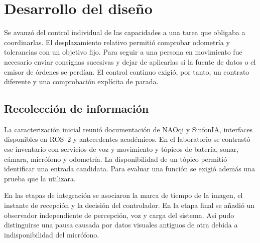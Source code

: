 \documentclass[11pt,letterpaper]{article}
\begin{document}
\clearpage
\section{Desarrollo del diseño}
Se avanzó del control individual de las capacidades a una tarea que obligaba a coordinarlas. El desplazamiento relativo permitió comprobar odometría y tolerancias con un objetivo fijo. Para seguir a una persona en movimiento fue necesario enviar consignas sucesivas y dejar de aplicarlas si la fuente de datos o el emisor de órdenes se perdían. El control continuo exigió, por tanto, un contrato diferente y una comprobación explícita de parada.

\subsection{Recolección de información}
La caracterización inicial reunió documentación de NAOqi y SinfonIA, interfaces disponibles en ROS~2 y antecedentes académicos. En el laboratorio se contrastó ese inventario con servicios de voz y movimiento y tópicos de batería, sonar, cámara, micrófono y odometría. La disponibilidad de un tópico permitió identificar una entrada candidata. Para evaluar una función se exigió además una prueba que la utilizara.

En las etapas de integración se asociaron la marca de tiempo de la imagen, el instante de recepción y la decisión del controlador. En la etapa final se añadió un observador independiente de percepción, voz y carga del sistema. Así pudo distinguirse una pausa causada por datos visuales antiguos de otra debida a indisponibilidad del micrófono.
\end{document}
